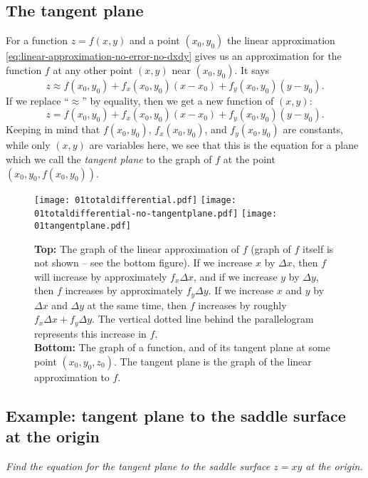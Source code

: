 \subsection{The tangent plane}
For a function $z=f(x,y)$ and a point $(x_0,y_0)$ the linear approximation
\eqref{eq:linear-approximation-no-error-no-dxdy} gives us an approximation for
the function $f$ at any other point $(x,y)$ near $(x_0,y_0)$.  It says
\[
z \approx f(x_0, y_0) + f_x(x_0, y_0) (x-x_0) + f_y(x_0, y_0) (y-y_0).
\]
If we replace ``$\approx$'' by equality, then we get a new function of $(x,y)$:
\begin{equation}
  z = f(x_0, y_0) + f_x(x_0, y_0) (x-x_0) + f_y(x_0, y_0) (y-y_0).
  \label{eq:tangent-plane}
\end{equation}
Keeping in mind that $f(x_0, y_0)$, $f_x(x_0, y_0)$, and $f_y(x_0, y_0)$ are
constants, while only $(x,y)$ are variables here, we see that this is the
equation for a plane which we call the \emph{tangent plane} to the graph of $f$
at the point $(x_0, y_0, f(x_0, y_0))$.

\begin{figure}[t]
  \begin{center}
    \texttt{[image: 01totaldifferential.pdf]}
    \texttt{[image: 01totaldifferential-no-tangentplane.pdf]}
    \texttt{[image: 01tangentplane.pdf]}
  \end{center}
  \caption{\textbf{Top: } The graph of the linear approximation of $f$ (graph of
    $f$ itself is not shown -- see the bottom figure).  If we increase $x$ by
    $\Delta x$, then $f$ will increase by approximately $f_x \Delta x$, and if
    we increase $y$ by $\Delta y$, then $f$ increases by approximately $f_y
    \Delta y$.  If we increase $x$ and $y$ by $\Delta x$ and $\Delta y$ at the
    same time, then $f$ increases by roughly $f_x\Delta x+f_y \Delta y$. The
    vertical dotted line behind
    the parallelogram represents this increase in $f$.\\
    \null\quad\textbf{Bottom: } The graph of a function, and of its tangent
    plane at some point $(x_0, y_0, z_0)$. The tangent plane is the graph of the
    linear approximation to $f$. }
  \label{fig:total-differential-and-tangent-plane}
\end{figure}



\subsection{Example: tangent plane to the saddle surface at the origin}     
\textit{Find the equation for the tangent plane to the saddle surface $z=xy$ at
  the origin.  }

